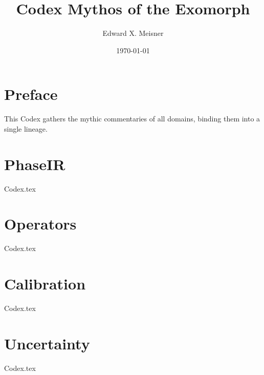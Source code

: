 \documentclass{article}
\title{Codex Mythos of the Exomorph}
\author{Edward X. Meisner}
\date{\today}
\begin{document}
\maketitle

\section*{Preface}
This Codex gathers the mythic commentaries of all domains, 
binding them into a single lineage.

\section*{PhaseIR}
{Codex.tex}

\section*{Operators}
{Codex.tex}

\section*{Calibration}
{Codex.tex}

\section*{Uncertainty}
{Codex.tex}
\end{document}
